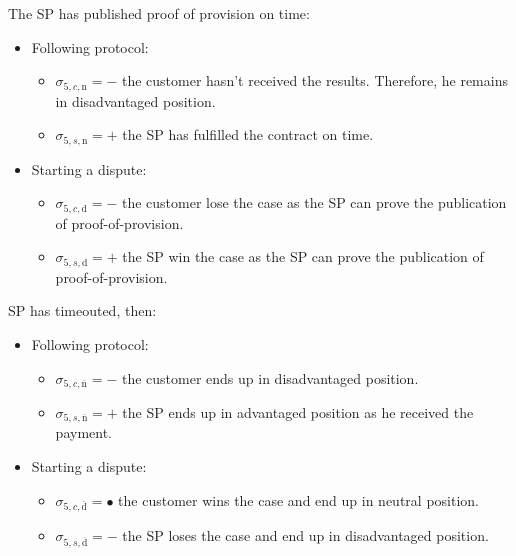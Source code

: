 \documentclass{ieeeaccess}
\begin{document}
The SP has published proof of provision on time:

\begin{itemize}
\item
  Following protocol:

  \begin{itemize}
  
  \item
    \(\sigma_{5, c, \mathrm{n}} = -\) the customer hasn't received the
    results. Therefore, he remains in disadvantaged position.
  \item
    \(\sigma_{5, s, \mathrm{n}} = +\) the SP has fulfilled the contract
    on time.
  \end{itemize}
\item
  Starting a dispute:

  \begin{itemize}
  
  \item
    \(\sigma_{5, c, \mathrm{d}} = -\) the customer lose the case as the
    SP can prove the publication of proof-of-provision.
  \item
    \(\sigma_{5, s, \mathrm{d}} = +\) the SP win the case as the SP can
    prove the publication of proof-of-provision.
  \end{itemize}
\end{itemize}

SP has timeouted, then:

\begin{itemize}
\item
  Following protocol:

  \begin{itemize}
  
  \item
    \(\sigma_{5, c, \overline{\mathrm{n}}} = -\) the customer ends up in disadvantaged position.
  \item
    \(\sigma_{5, s, \overline{\mathrm{n}}} = +\) the SP ends up in
    advantaged position as he received the payment.
  \end{itemize}
\item
  Starting a dispute:

  \begin{itemize}
  
  \item
    \(\sigma_{5, c, \overline{\mathrm{d}}} = •\) the customer wins the
    case and end up in neutral position.
  \item
    \(\sigma_{5, s, \overline{\mathrm{d}}} = -\) the SP loses the case
    and end up in disadvantaged position.
  \end{itemize}
\end{itemize}
\end{document}
